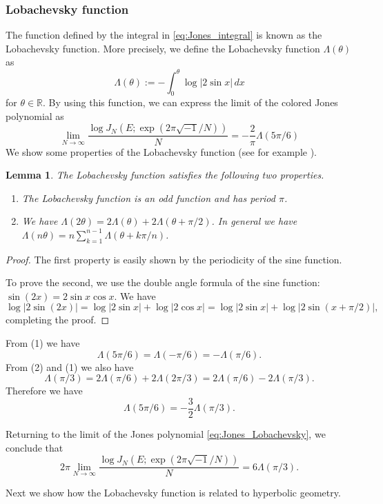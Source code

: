 \documentclass{amsart}
\newcommand{\R}{\mathbb{R}}
\newtheorem{lemma}[theorem]{Lemma}
\theoremstyle{definition}
\theoremstyle{remark}
\numberwithin{equation}{section}
\begin{document}
\subsubsection{Lobachevsky function}
The function defined by the integral in \eqref{eq:Jones_integral} is known as the Lobachevsky function.
More precisely, we define the Lobachevsky function $\Lambda(\theta)$ as
\begin{equation*}
  \Lambda(\theta)
  :=
  -\int_{0}^{\theta}\log|2\sin{x}|\,dx
\end{equation*}
for $\theta\in\R$.
By using this function, we can express the limit of the colored Jones polynomial as
\begin{equation}\label{eq:Jones_Lobachevsky}
  \lim_{N\to\infty}
  \frac{\log{J_N\left(E;\exp(2\pi\sqrt{-1}/N)\right)}}{N}
  =
  -\frac{2}{\pi}\Lambda(5\pi/6)
\end{equation}
We show some properties of the Lobachevsky function (see for example \cite{Milnor:BULAM382}).
\begin{lemma}
The Lobachevsky function satisfies the following two properties.
\begin{enumerate}
\item The Lobachevsky function is an odd function and has period $\pi$.
\item We have $\Lambda(2\theta)=2\Lambda(\theta)+2\Lambda(\theta+\pi/2)$.
In general we have $\Lambda(n\theta)=n\sum_{k=1}^{n-1}\Lambda(\theta+k\pi/n)$.
\end{enumerate}
\end{lemma}
\begin{proof}
The first property is easily shown by the periodicity of the sine function.
\par
To prove the second, we use the double angle formula of the sine function: $\sin(2x)=2\sin{x}\cos{x}$.
We have
\begin{equation*}
  \log|2\sin(2x)|
  =
  \log|2\sin{x}|
  +
  \log|2\cos{x}|
  =
  \log|2\sin x|
  +
  \log|2\sin(x+\pi/2)|,
\end{equation*}
completing the proof.
\end{proof}
From (1) we have
\begin{equation*}
  \Lambda(5\pi/6)
  =
  \Lambda(-\pi/6)
  =
  -\Lambda(\pi/6).
\end{equation*}
From (2) and (1) we also have
\begin{equation*}
  \Lambda(\pi/3)
  =
  2\Lambda(\pi/6)+2\Lambda(2\pi/3)
  =
  2\Lambda(\pi/6)-2\Lambda(\pi/3).
\end{equation*}
Therefore we have
\begin{equation*}
  \Lambda(5\pi/6)=-\frac{3}{2}\Lambda(\pi/3).
\end{equation*}
\par
Returning to the limit of the Jones polynomial \eqref{eq:Jones_Lobachevsky}, we conclude that
\begin{equation*}
  2\pi\lim_{N\to\infty}
  \frac{\log{J_N\left(E;\exp(2\pi\sqrt{-1}/N)\right)}}{N}
  =
  6\Lambda(\pi/3).
\end{equation*}
\par
Next we show how the Lobachevsky function is related to hyperbolic geometry.
\end{document}
